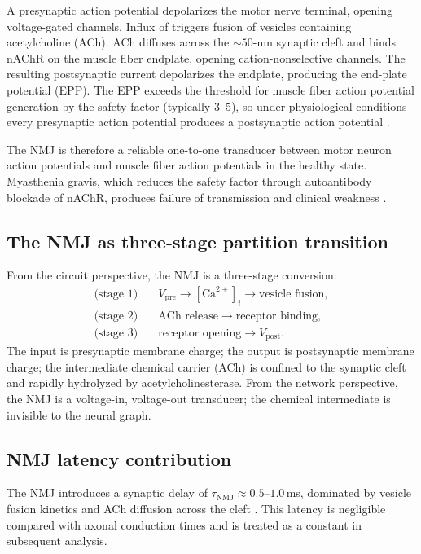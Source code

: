 \documentclass[11pt,twocolumn,a4paper]{article}
\theoremstyle{definition}
\theoremstyle{remark}
\begin{document}
A presynaptic action potential depolarizes the motor nerve terminal,
opening voltage-gated  channels. Influx of 
triggers fusion of vesicles containing acetylcholine (ACh). ACh
diffuses across the $\sim 50$-nm synaptic cleft and binds nAChR on
the muscle fiber endplate, opening cation-nonselective channels. The
resulting postsynaptic current depolarizes the endplate, producing
the end-plate potential (EPP). The EPP exceeds the threshold for
muscle fiber action potential generation by the safety factor
(typically $3$--$5$), so under physiological conditions every
presynaptic action potential produces a postsynaptic action
potential \citep{katz1967,wood2001,ruff2011}.

The NMJ is therefore a reliable one-to-one transducer between motor
neuron action potentials and muscle fiber action potentials in the
healthy state. Myasthenia gravis, which reduces the safety factor
through autoantibody blockade of nAChR, produces failure of
transmission and clinical weakness \citep{ruff2011}.

\subsection{The NMJ as three-stage partition transition}

From the circuit perspective, the NMJ is a three-stage conversion:
\begin{align}
\text{(stage 1)} \quad & V_{\mathrm{pre}} \to [\mathrm{Ca}^{2+}]_i
\to \text{vesicle fusion}, \\
\text{(stage 2)} \quad & \text{ACh release} \to \text{receptor binding}, \\
\text{(stage 3)} \quad & \text{receptor opening} \to V_{\mathrm{post}}.
\end{align}
The input is presynaptic membrane charge; the output is postsynaptic
membrane charge; the intermediate chemical carrier (ACh) is confined
to the synaptic cleft and rapidly hydrolyzed by acetylcholinesterase.
From the network perspective, the NMJ is a voltage-in, voltage-out
transducer; the chemical intermediate is invisible to the neural
graph.

\subsection{NMJ latency contribution}

The NMJ introduces a synaptic delay of $\tau_{\mathrm{NMJ}} \approx
0.5$--$1.0$\,ms, dominated by vesicle fusion kinetics and ACh
diffusion across the cleft \citep{katz1967}. This latency is
negligible compared with axonal conduction times and is treated as a
constant in subsequent analysis.
\end{document}

